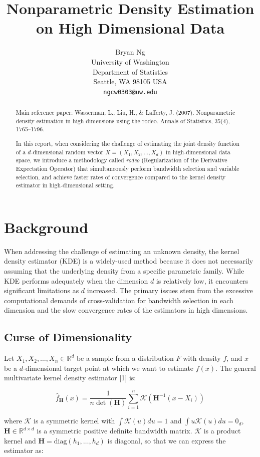 \documentclass{article}
\title{Nonparametric Density Estimation on High Dimensional Data}
\author{%
Bryan Ng \\
University of Washington\\
Department of Statistics \\
Seattle, WA 98105 USA \\
\texttt{ngcw0303@uw.edu}\\
}
\begin{document}
\maketitle


\begin{abstract}
  Main reference paper: Wasserman, L., Liu, H., \& Lafferty, J. (2007). Nonparametric density estimation in high dimensions using the rodeo. Annals of Statistics, 35(4), 1765–1796.
  
  In this report, when considering the challenge of estimating the joint density function of a $d$-dimensional random vector 
  $X = (X_1, X_2, \ldots, X_d)$ in high-dimensional data space, we introduce a methodology called \emph{rodeo} (Regularization of the Derivative Expectation Operator) that simultaneously perform bandwidth selection and variable selection, and achieve faster rates of convergence compared to the kernel density estimator in high-dimensional setting.

\end{abstract}

\section{Background}

When addressing the challenge of estimating an unknown density, the kernel density estimator (KDE) is a widely-used method because it does not necessarily assuming that the underlying density from a specific parametric family. While KDE performs adequately when the dimension $d$ is relatively low, it encounters significant limitations as $d$ increased. The primary issues stem from the excessive computational demands of cross-validation for bandwidth selection in each dimension and the slow convergence rates of the estimators in high dimensions.


\subsection{Curse of Dimensionality}
Let $X_1, X_2, \ldots, X_n \in \mathbb{R}^d$ be a sample from a distribution $F$
with density $f$, and $x$ be a $d$-dimensional target point at which we want to estimate $f(x)$. The general multivariate kernel density estimator [1] is:

$$
\hat{f}_\mathbf{H}(x) = \frac{1}{n \det(\mathbf{H})} \sum_{i=1}^n \mathcal{K}\left(\mathbf{H}^{-1}(x - X_i)\right)
$$

where $\mathcal{K}$ is a symmetric kernel with $\int \mathcal{K}(u) du = 1$ and $\int u \mathcal{K}(u) du = 0_d$, $\mathbf{H} \in \mathbb{R}^{d \times d}$ is a symmetric positive definite bandwidth matrix. $\mathcal{K}$ is a product kernel and $\mathbf{H} = \text{diag}(h_1, \ldots, h_d)$ is diagonal, so that we can express the estimator as:
\end{document}
